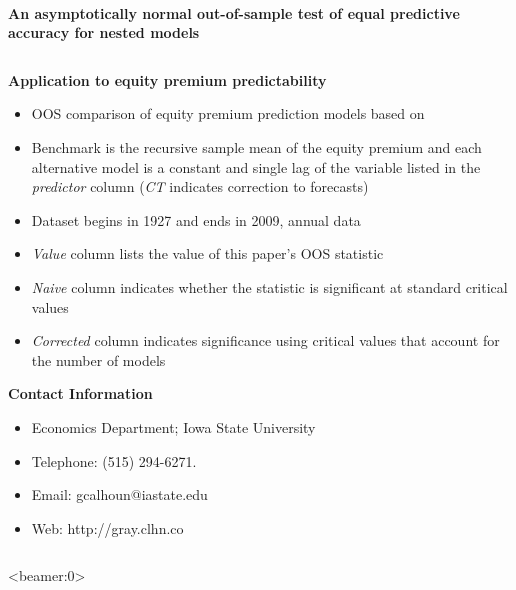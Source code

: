 \documentclass[final]{beamer}
\begin{document}
\begin{frame}{\\\centering \textbf{\huge An asymptotically normal out-of-sample
    test of equal predictive accuracy for nested models}}
\begin{columns}[t]
    \begin{column}{.23\linewidth}
      \begin{block}{\textbf{Application to equity premium predictability}}
        \smallskip
        \bigskip
        {
          \footnotesize
          \empiricaltable
        }

        \begin{itemize}
        \item OOS comparison of equity premium prediction models
          based on \citet{GoW:08}
        \item Benchmark is the recursive sample mean of the equity
          premium and each alternative model is a constant and single
          lag of the variable listed in the \emph{predictor} column
          (\emph{CT} indicates  correction to forecasts)
        \item Dataset begins in 1927 and ends in 2009, annual data
        \item \emph{Value} column lists the value of this paper's
          OOS statistic
        \item \emph{Naive} column indicates whether the statistic is
          significant at standard critical values
        \item \emph{Corrected} column indicates significance using
          critical values that account for the number of models
        \end{itemize}
      \end{block}

      \begin{block}{\textbf{Contact Information}}
        \begin{itemize}
        \item Economics Department; Iowa State University
        \item Telephone: (515) 294-6271.
        \item Email: gcalhoun@iastate.edu
        \item Web: http://gray.clhn.co
        \end{itemize}
      \end{block}

      
    \end{column}
  \end{columns}
\end{frame}
\begin{frame}<beamer:0>
    
\end{frame}
\end{document}
